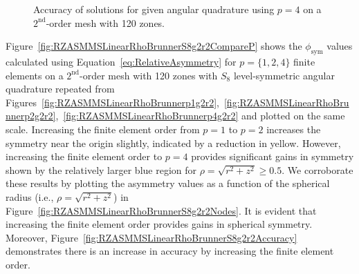 \documentclass[12pt]{article}
\begin{document}
\begin{figure}[!htb]
\centering
{}
\caption{Accuracy of solutions for given angular quadrature using $p=4$ on a $2^\text{nd}$-order mesh with 120 zones.}
\label{fig:RZASMMSLinearRhoBrunnerp4g2r2Accuracy}
\end{figure}

\FloatBarrier

Figure~\ref{fig:RZASMMSLinearRhoBrunnerS8g2r2CompareP} shows the $\phi_\text{sym}$ values calculated using Equation~\ref{eq:RelativeAsymmetry} for $p=\{1,2,4\}$ finite elements on a $2^\text{nd}$-order mesh with 120 zones with $S_8$ level-symmetric angular quadrature repeated from Figures~\ref{fig:RZASMMSLinearRhoBrunnerp1g2r2},~\ref{fig:RZASMMSLinearRhoBrunnerp2g2r2},~\ref{fig:RZASMMSLinearRhoBrunnerp4g2r2} and plotted on the same scale. Increasing the finite element order from $p=1$ to $p=2$ increases the symmetry near the origin slightly, indicated by a reduction in yellow. However, increasing the finite element order to $p=4$ provides significant gains in symmetry shown by the relatively larger blue region for $\rho=\sqrt{r^2+z^2} \geq 0.5$. We corroborate these results by plotting the asymmetry values as a function of the spherical radius (i.e., $\rho=\sqrt{r^2+z^2}$) in Figure~\ref{fig:RZASMMSLinearRhoBrunnerS8g2r2Nodes}. It is evident that increasing the finite element order provides gains in spherical symmetry. Moreover, Figure~\ref{fig:RZASMMSLinearRhoBrunnerS8g2r2Accuracy} demonstrates there is an increase in accuracy by increasing the finite element order.
\end{document}
